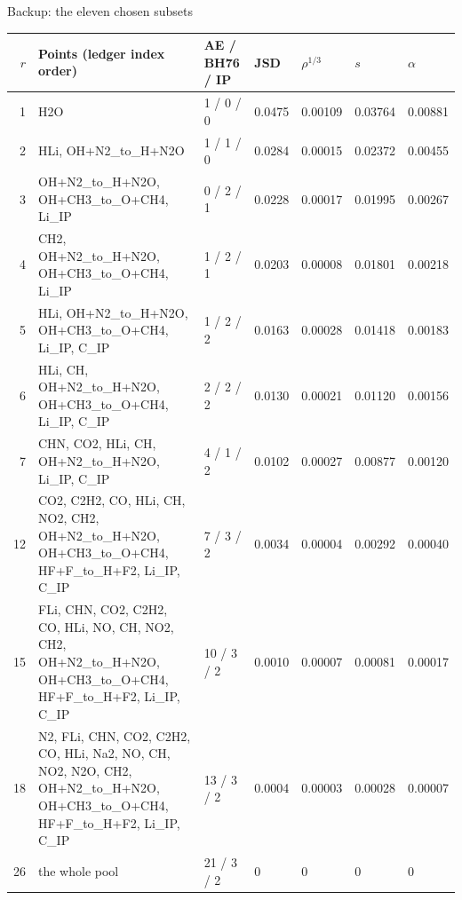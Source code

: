 \begin{frame}[label=b4]{Backup: the eleven chosen subsets}
  \begin{center}\scriptsize\setlength{\tabcolsep}{2pt}
  \begin{tabular}{rp{7.0cm}lllll}
  \toprule
  $r$ & Points (ledger index order) & AE / BH76 / IP & JSD & $\rho^{1/3}$ & $s$ & $\alpha$ \\ \midrule
  1 & H2O & 1 / 0 / 0 & 0.0475 & 0.00109 & 0.03764 & 0.00881 \\
  2 & HLi, OH+N2\_to\_H+N2O & 1 / 1 / 0 & 0.0284 & 0.00015 & 0.02372 & 0.00455 \\
  3 & OH+N2\_to\_H+N2O, OH+CH3\_to\_O+CH4, Li\_IP & 0 / 2 / 1 & 0.0228 & 0.00017 & 0.01995 & 0.00267 \\
  4 & CH2, OH+N2\_to\_H+N2O, OH+CH3\_to\_O+CH4, Li\_IP & 1 / 2 / 1 & 0.0203 & 0.00008 & 0.01801 & 0.00218 \\
  5 & HLi, OH+N2\_to\_H+N2O, OH+CH3\_to\_O+CH4, Li\_IP, C\_IP & 1 / 2 / 2 & 0.0163 & 0.00028 & 0.01418 & 0.00183 \\
  6 & HLi, CH, OH+N2\_to\_H+N2O, OH+CH3\_to\_O+CH4, Li\_IP, C\_IP & 2 / 2 / 2 & 0.0130 & 0.00021 & 0.01120 & 0.00156 \\
  7 & CHN, CO2, HLi, CH, OH+N2\_to\_H+N2O, Li\_IP, C\_IP & 4 / 1 / 2 & 0.0102 & 0.00027 & 0.00877 & 0.00120 \\
  12 & CO2, C2H2, CO, HLi, CH, NO2, CH2, OH+N2\_to\_H+N2O, OH+CH3\_to\_O+CH4, HF+F\_to\_H+F2, Li\_IP, C\_IP & 7 / 3 / 2 & 0.0034 & 0.00004 & 0.00292 & 0.00040 \\
  15 & FLi, CHN, CO2, C2H2, CO, HLi, NO, CH, NO2, CH2, OH+N2\_to\_H+N2O, OH+CH3\_to\_O+CH4, HF+F\_to\_H+F2, Li\_IP, C\_IP & 10 / 3 / 2 & 0.0010 & 0.00007 & 0.00081 & 0.00017 \\
  18 & N2, FLi, CHN, CO2, C2H2, CO, HLi, Na2, NO, CH, NO2, N2O, CH2, OH+N2\_to\_H+N2O, OH+CH3\_to\_O+CH4, HF+F\_to\_H+F2, Li\_IP, C\_IP & 13 / 3 / 2 & 0.0004 & 0.00003 & 0.00028 & 0.00007 \\
  26 & the whole pool & 21 / 3 / 2 & 0 & 0 & 0 & 0 \\
  \bottomrule
  \end{tabular}
  \end{center}
  \hfill \hyperlink{f14}{}
\end{frame}


